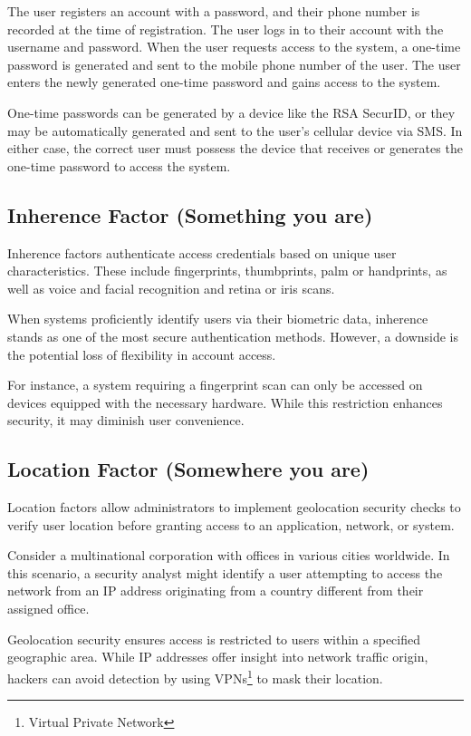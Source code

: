 The user registers an account with a password, and their phone number is recorded at the time of registration.
The user logs in to their account with the username and password.
When the user requests access to the system, a one-time password is generated and sent to the mobile phone number of the user.
The user enters the newly generated one-time password and gains access to the system.

One-time passwords can be generated by a device like the RSA SecurID, or they may be automatically generated and sent to the user's cellular device via SMS.
In either case, the correct user must possess the device that receives or generates the one-time password to access the system.

\newpage
\subsection{Inherence Factor (Something you are)}
Inherence factors authenticate access credentials based on unique user characteristics.
These include fingerprints, thumbprints, palm or handprints, as well as voice and facial recognition and retina or iris scans.

When systems proficiently identify users via their biometric data, inherence stands as one of the most secure authentication methods.
However, a downside is the potential loss of flexibility in account access.

For instance, a system requiring a fingerprint scan can only be accessed on devices equipped with the necessary hardware.
While this restriction enhances security, it may diminish user convenience. \cite{auth-factors-rublon}

\subsection{Location Factor (Somewhere you are)}
Location factors allow administrators to implement geolocation security checks to verify user location before granting access to an application, network, or system.

Consider a multinational corporation with offices in various cities worldwide.
In this scenario, a security analyst might identify a user attempting to access the network from an IP address originating from a country different from their assigned office.

Geolocation security ensures access is restricted to users within a specified geographic area.
While IP addresses offer insight into network traffic origin, hackers can avoid detection by using VPNs\footnote{Virtual Private Network} to mask their location.

